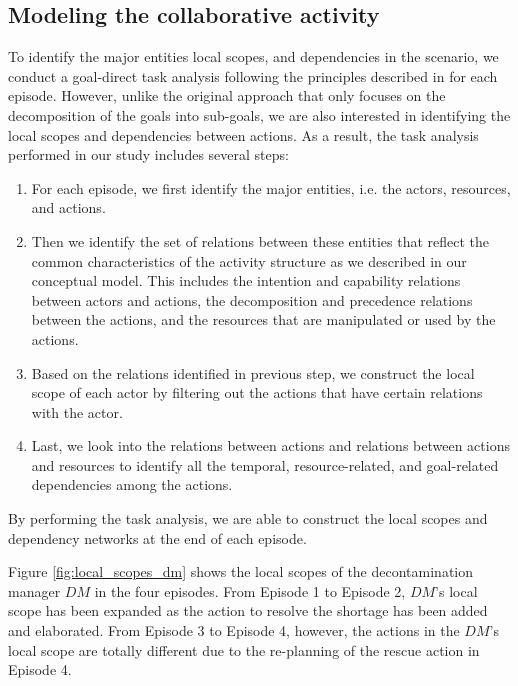 \subsection{Modeling the collaborative activity} %
\label{sub:analyzing_the_characteristics_of_awareness}
To identify the major entities local scopes, and dependencies in the scenario, we conduct a goal-direct task analysis following the principles described in \cite{endsley2000direct} for each episode. However, unlike the original approach that only focuses on the decomposition of the goals into sub-goals, we are also interested in identifying the local scopes and dependencies between actions. As a result, the task analysis performed in our study includes several steps:

\begin{enumerate}
	\item For each episode, we first identify the major entities, i.e. the actors, resources, and actions.
	\item Then we identify the set of relations between these entities that reflect the common characteristics of the activity structure as we described in our conceptual model. This includes the intention and capability relations between actors and actions, the decomposition and precedence relations between the actions, and the resources that are manipulated or used by the actions.
	\item Based on the relations identified in previous step, we construct the local scope of each actor by filtering out the actions that have certain relations with the actor.
	\item Last, we look into the relations between actions and relations between actions and resources to identify all the temporal, resource-related, and goal-related dependencies among the actions.
\end{enumerate}

By performing the task analysis, we are able to construct the local scopes and dependency networks at the end of each episode. 

Figure \ref{fig:local_scopes_dm} shows the local scopes of the decontamination manager $DM$ in the four episodes. From Episode 1 to Episode 2, $DM$'s local scope has been expanded as the action to resolve the shortage has been added and elaborated. From Episode 3 to Episode 4, however, the actions in the $DM$'s local scope are totally different due to the re-planning of the rescue action in Episode 4.

